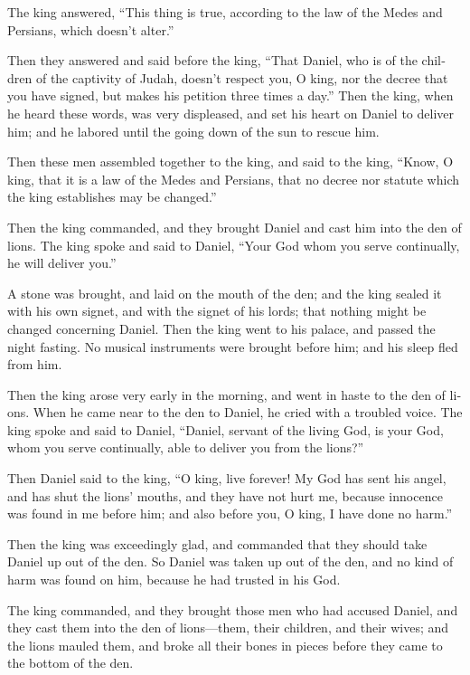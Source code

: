 \begin{paracol}{2}
\begin{otherlanguage}{english}
The king answered, ``This thing is true, according to the law of the
Medes and Persians, which doesn't alter.''

 Then they answered and said before the king, ``That
Daniel, who is of the children of the captivity of Judah, doesn't
respect you, O king, nor the decree that you have signed, but makes his
petition three times a day.''  Then the king, when he
heard these words, was very displeased, and set his heart on Daniel to
deliver him; and he labored until the going down of the sun to rescue
him.

 Then these men assembled together to the king, and said
to the king, ``Know, O king, that it is a law of the Medes and Persians,
that no decree nor statute which the king establishes may be changed.''

 Then the king commanded, and they brought Daniel and
cast him into the den of lions. The king spoke and said to Daniel,
``Your God whom you serve continually, he will deliver you.''

 A stone was brought, and laid on the mouth of the den;
and the king sealed it with his own signet, and with the signet of his
lords; that nothing might be changed concerning Daniel. 
Then the king went to his palace, and passed the night fasting. No
musical instruments were brought before him; and his sleep fled from
him.

 Then the king arose very early in the morning, and went
in haste to the den of lions.  When he came near to the
den to Daniel, he cried with a troubled voice. The king spoke and said
to Daniel, ``Daniel, servant of the living God, is your God, whom you
serve continually, able to deliver you from the lions?''

 Then Daniel said to the king, ``O king, live forever!
 My God has sent his angel, and has shut the lions'
mouths, and they have not hurt me, because innocence was found in me
before him; and also before you, O king, I have done no harm.''

 Then the king was exceedingly glad, and commanded that
they should take Daniel up out of the den. So Daniel was taken up out of
the den, and no kind of harm was found on him, because he had trusted in
his God.

 The king commanded, and they brought those men who had
accused Daniel, and they cast them into the den of lions---them, their
children, and their wives; and the lions mauled them, and broke all
their bones in pieces before they came to the bottom of the den.


\end{otherlanguage}
\end{paracol}
